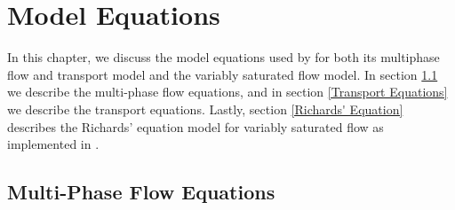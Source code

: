 
\chapter{Model Equations}
\label{Model_Equations}

In this chapter, we discuss the model equations used by \parflow{} for both its
multiphase flow and transport model and the variably saturated flow model.
In section \ref{Multi-Phase Flow Equations} we describe the multi-phase
flow equations, and in section \ref{Transport Equations} we describe
the transport equations.  Lastly, section \ref{Richards' Equation} 
describes the Richards' equation model for variably saturated flow as 
implemented in \parflow{}.  

\section{Multi-Phase Flow Equations}
\label{Multi-Phase Flow Equations}

